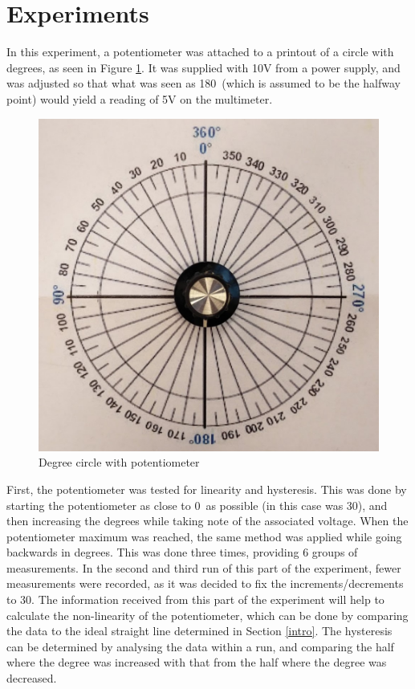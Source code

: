 \documentclass[a4,11pt]{article}
\begin{document}
\section{Experiments}
In this experiment, a potentiometer was attached to a printout of a circle with degrees, as seen in Figure \ref{fig:degcirc}. It was supplied with 10V from a power supply, and was adjusted so that what was seen as 180\degree\ (which is assumed to be the halfway point) would yield a reading of 5V on the multimeter.

\begin{figure}[h] 
	\centering
	\includegraphics[width=0.75\columnwidth]{degcirc.png}
	\caption{
		\label{fig:degcirc} %
		Degree circle with potentiometer
	}
\end{figure}

First, the potentiometer was tested for linearity and hysteresis. This was done by starting the potentiometer as close to 0\degree\ as possible (in this case was 30\degree), and then increasing the degrees while taking note of the associated voltage. When the potentiometer maximum was reached, the same method was applied while going backwards in degrees. This was done three times, providing 6 groups of measurements. In the second and third run of this part of the experiment, fewer measurements were recorded, as it was decided to fix the increments/decrements to 30\degree. The information received from this part of the experiment will help to calculate the non-linearity of the potentiometer, which can be done by comparing the data to the ideal straight line determined in Section \ref{intro}. The hysteresis can be determined by analysing the data within a run, and comparing the half where the degree was increased with that from the half where the degree was decreased.
\end{document}
